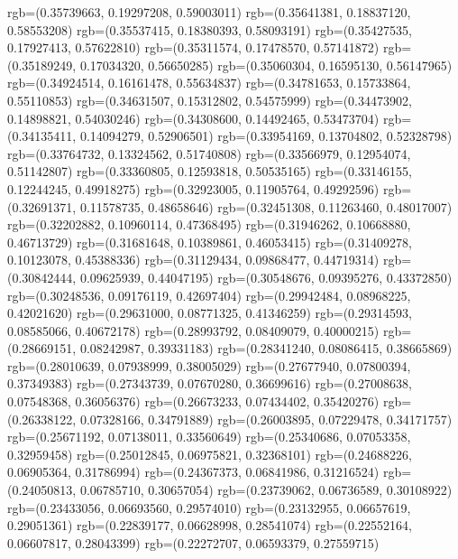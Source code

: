 {{        rgb=(0.35739663, 0.19297208, 0.59003011)
        rgb=(0.35641381, 0.18837120, 0.58553208)
        rgb=(0.35537415, 0.18380393, 0.58093191)
        rgb=(0.35427535, 0.17927413, 0.57622810)
        rgb=(0.35311574, 0.17478570, 0.57141872)
        rgb=(0.35189249, 0.17034320, 0.56650285)
        rgb=(0.35060304, 0.16595130, 0.56147965)
        rgb=(0.34924514, 0.16161478, 0.55634837)
        rgb=(0.34781653, 0.15733864, 0.55110853)
        rgb=(0.34631507, 0.15312802, 0.54575999)
        rgb=(0.34473902, 0.14898821, 0.54030246)
        rgb=(0.34308600, 0.14492465, 0.53473704)
        rgb=(0.34135411, 0.14094279, 0.52906501)
        rgb=(0.33954169, 0.13704802, 0.52328798)
        rgb=(0.33764732, 0.13324562, 0.51740808)
        rgb=(0.33566979, 0.12954074, 0.51142807)
        rgb=(0.33360805, 0.12593818, 0.50535165)
        rgb=(0.33146155, 0.12244245, 0.49918275)
        rgb=(0.32923005, 0.11905764, 0.49292596)
        rgb=(0.32691371, 0.11578735, 0.48658646)
        rgb=(0.32451308, 0.11263460, 0.48017007)
        rgb=(0.32202882, 0.10960114, 0.47368495)
        rgb=(0.31946262, 0.10668880, 0.46713729)
        rgb=(0.31681648, 0.10389861, 0.46053415)
        rgb=(0.31409278, 0.10123078, 0.45388336)
        rgb=(0.31129434, 0.09868477, 0.44719314)
        rgb=(0.30842444, 0.09625939, 0.44047195)
        rgb=(0.30548676, 0.09395276, 0.43372850)
        rgb=(0.30248536, 0.09176119, 0.42697404)
        rgb=(0.29942484, 0.08968225, 0.42021620)
        rgb=(0.29631000, 0.08771325, 0.41346259)
        rgb=(0.29314593, 0.08585066, 0.40672178)
        rgb=(0.28993792, 0.08409079, 0.40000215)
        rgb=(0.28669151, 0.08242987, 0.39331183)
        rgb=(0.28341240, 0.08086415, 0.38665869)
        rgb=(0.28010639, 0.07938999, 0.38005029)
        rgb=(0.27677940, 0.07800394, 0.37349383)
        rgb=(0.27343739, 0.07670280, 0.36699616)
        rgb=(0.27008638, 0.07548368, 0.36056376)
        rgb=(0.26673233, 0.07434402, 0.35420276)
        rgb=(0.26338122, 0.07328166, 0.34791889)
        rgb=(0.26003895, 0.07229478, 0.34171757)
        rgb=(0.25671192, 0.07138011, 0.33560649)
        rgb=(0.25340686, 0.07053358, 0.32959458)
        rgb=(0.25012845, 0.06975821, 0.32368101)
        rgb=(0.24688226, 0.06905364, 0.31786994)
        rgb=(0.24367373, 0.06841986, 0.31216524)
        rgb=(0.24050813, 0.06785710, 0.30657054)
        rgb=(0.23739062, 0.06736589, 0.30108922)
        rgb=(0.23433056, 0.06693560, 0.29574010)
        rgb=(0.23132955, 0.06657619, 0.29051361)
        rgb=(0.22839177, 0.06628998, 0.28541074)
        rgb=(0.22552164, 0.06607817, 0.28043399)
        rgb=(0.22272707, 0.06593379, 0.27559715)
}}
